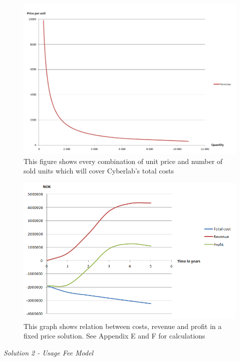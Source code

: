 \begin{figure}
\includegraphics[scale=0.6]{relationpriceandunits}
\caption[Relation between price per unit and number of sold units]{This figure shows every combination of unit price and number of sold units which will cover Cyberlab's total costs}
\label{fig:RelationPriceAndUnits}
\end{figure}
\begin{figure}
\begin{center}
\includegraphics[scale=0.8]{profitfixed}
\caption[Profit, Revenue and Cost for a Fixed Price Solution]{This graph shows relation between costs, revenue and profit in a fixed price solution. See Appendix E and F for calculations}
\label{fig:ProfitFixed}
\end{center}
\end{figure}
\emph{Solution 2 - Usage Fee Model}\\ \\
